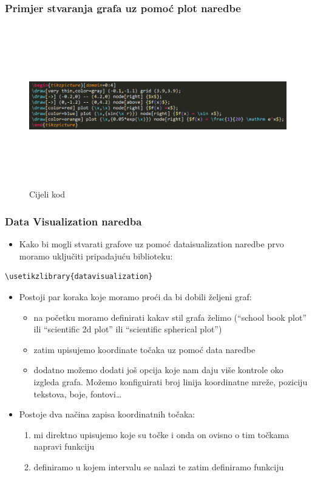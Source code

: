 \documentclass{beamer}
\begin{document}
	\begin{frame}
	\frametitle{Primjer stvaranja grafa uz pomoć plot naredbe}
		\begin{figure}
			\begin{center}
				\includegraphics[width=12 cm,height=7cm]{graf_1_kod.png}
				\caption{Cijeli kod}
			\end{center}
		\end{figure}
	\end{frame}

\begin{frame}[fragile]
	\frametitle{Data Visualization naredba}
		\begin{itemize}
			\item Kako bi mogli stvarati grafove uz pomoć dataisualization naredbe prvo moramo uključiti pripadajuću biblioteku:
		\end{itemize}
		\begin{verbatim}\usetikzlibrary{datavisualization}
		\end{verbatim}
		\begin{itemize}
			\item Postoji par koraka koje moramo proći da bi dobili željeni graf:
			\begin{itemize}
			\item na početku moramo definirati kakav stil grafa želimo (“school book plot” ili “scientific 2d plot” ili “scientific spherical plot”)
			\item zatim upisujemo koordinate točaka uz pomoć data naredbe
			\item dodatno možemo dodati još opcija koje nam daju više kontrole oko izgleda grafa. Možemo konfiguirati broj linija koordinatne mreže, poziciju tekstova, boje, fontovi…
			\end{itemize}
			\item Postoje dva načina zapisa koordinatnih točaka:
			\begin{enumerate}
			\item mi direktno upisujemo koje su točke i onda on ovisno o tim točkama napravi funkciju
			\item definiramo u kojem intervalu se nalazi te zatim definiramo funkciju
			\end{enumerate}
		\end{itemize}		
\end{frame}
\end{document}
